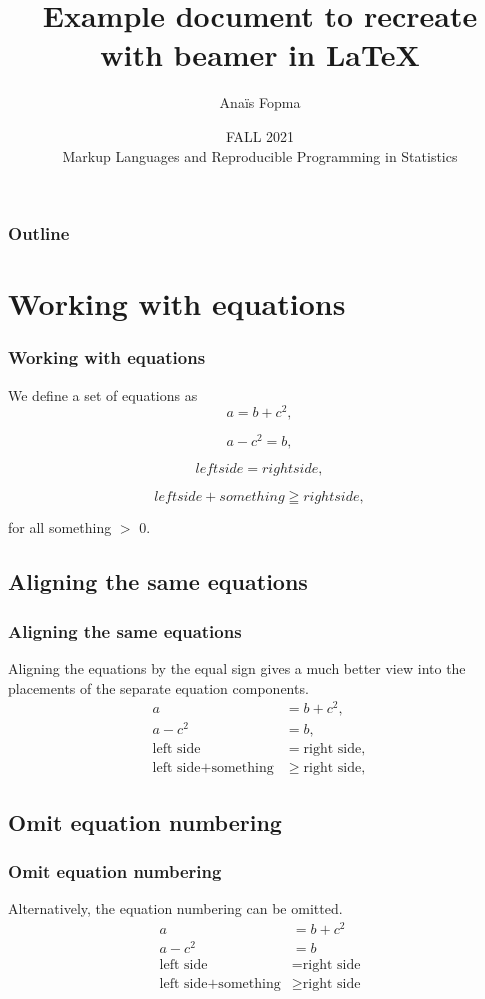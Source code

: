 \documentclass[9pt]{beamer}
\title{Example document to recreate with beamer in \LaTeX}
\author{Anaïs Fopma}
\date{FALL 2021 \\ Markup Languages and Reproducible Programming in Statistics}
\begin{document}
\frame{\titlepage}

\begin{frame}
\frametitle{Outline}

\tableofcontents

\end{frame}

\section{Working with equations}
\begin{frame}
\frametitle{Working with equations}

We define a set of equations as
\begin{equation}
a = b + c^2,
\end{equation}

\begin{equation}
a - c^2 = b,
\end{equation}

\begin{equation}
left side = right side,
\end{equation}

\begin{equation}
left side + something \geqq right side,  
\end{equation}

for all something $>$ 0.
\end{frame}

\subsection{Aligning the same equations}
\begin{frame}
\frametitle{Aligning the same equations}
Aligning the equations by the equal sign gives a much better view into the placements of the separate equation components. 
    \begin{align}
    	a&=b+c^2,\\
    	a-c^2&=b,\\
    	\text{left side} &= \text{right side},\\
    	\text{left side} + \text{something} & \geq \text{right side},
    \end{align}
\end{frame}

\subsection{Omit equation numbering}
\begin{frame}
\frametitle{Omit equation numbering}
    Alternatively, the equation numbering can be omitted. 
    \begin{align*}
    	a&=b+c^2\\
    	a-c^2&=b\\
    	\text{left side} &= \text{right side}\\
    	\text{left side} + \text{something} & \geq \text{right side}
    \end{align*}
\end{frame}
\end{document}
